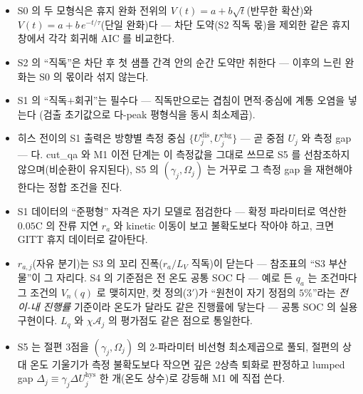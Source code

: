 \documentclass[11pt,a4paper]{article}
\newcommand{\dis}{\mathrm{dis}}
\newcommand{\chg}{\mathrm{chg}}
\newcommand{\hys}{\mathrm{hys}}
\begin{document}
\begin{itemize}[leftmargin=1.6em,itemsep=1pt]
\item S0 의 두 모형식은 휴지 완화 전위의 $V(t)=a+b\sqrt t$(반무한 확산)와
$V(t)=a+b\,e^{-t/\tau}$(단일 완화)다 — 차단 도약(S2 직독 몫)을 제외한 같은 휴지 창에서 각각
회귀해 AIC 를 비교한다.
\item S2 의 ``직독''은 차단 후 첫 샘플 간격 안의 순간 도약만 취한다 — 이후의 느린 완화는 S0 의
몫이라 섞지 않는다.
\item S1 의 ``직독$+$회귀''는 필수다 — 직독만으로는 겹침이 면적$\cdot$중심에 계통 오염을 넣는다
(검출 초기값으로 다-peak 평형식을 동시 최소제곱).
\item 히스 전이의 S1 출력은 방향별 측정 중심 $\{U_j^{\dis},U_j^{\chg}\}$ — 곧 중점 $U_j$ 와 측정
gap — 다. cut\_qa 와 M1 이전 단계는 이 측정값을 그대로 쓰므로 S5 를 선참조하지 않으며(비순환이
유지된다), S5 의 $(\gamma_j,\Omega_j)$ 는 거꾸로 그 측정 gap 을 재현해야 한다는 정합 조건을 진다.
\item S1 데이터의 ``준평형'' 자격은 자기 모델로 점검한다 — 확정 파라미터로 역산한 $0.05$C 의 잔류
지연 $r_a$ 와 kinetic 이동이 보고 불확도보다 작아야 하고, 크면 GITT 휴지 데이터로 갈아탄다.
\item $r_{a,j}$(자유 분기)는 S3 의 꼬리 진폭($r_a/L_V$ 직독)이 닫는다 — 참조표의 ``S3 부산물''이
그 자리다. S4 의 기준점은 전 온도 공통 SOC 다 — 예로 든 $q_a$ 는 조건마다 그 조건의 $V_n(q)$ 로
맺히지만, 컷 정의(3$'$)가 ``원천이 자기 정점의 $5\%$''라는 \emph{전이-내 진행률} 기준이라 온도가
달라도 같은 진행률에 닿는다 — 공통 SOC 의 실용 구현이다. $L_q$ 와 $\chi\mathcal A_j$ 의 평가점도
같은 점으로 통일한다.
\item S5 는 절편 3점을 $(\gamma_j,\Omega_j)$ 의 2-파라미터 비선형 최소제곱으로 풀되, 절편의 상대
온도 기울기가 측정 불확도보다 작으면 깊은 2상측 퇴화로 판정하고 lumped gap
$\Delta_j\equiv\gamma_j\Delta U_j^\hys$ 한 개(온도 상수)로 강등해 M1 에 직접 쓴다.
\end{itemize}
\end{document}
